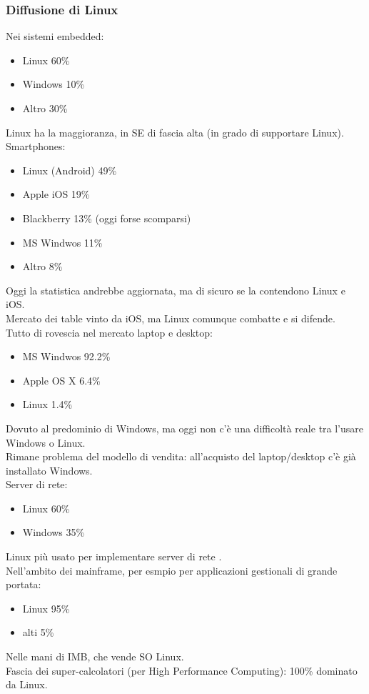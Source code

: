 \documentclass[12pt, oneside]{extbook}
\begin{document}
\subsubsection{Diffusione di Linux}
Nei sistemi embedded:
\begin{itemize}
\item Linux 60\%
\item Windows 10\%
\item Altro 30\%
\end{itemize}
Linux ha la maggioranza, in SE di fascia alta (in grado di supportare Linux).\\ Smartphones:
\begin{itemize}
\item Linux (Android) 49\%
\item Apple iOS 19\%
\item Blackberry 13\% (oggi forse scomparsi)
\item MS Windwos 11\%
\item Altro 8\%
\end{itemize}
Oggi la statistica andrebbe aggiornata, ma di sicuro se la contendono Linux e iOS.\\ Mercato dei table vinto da iOS, ma Linux comunque combatte e si difende.\\ Tutto di rovescia nel mercato laptop e desktop:
\begin{itemize}
\item MS Windwos 92.2\%
\item Apple OS X 6.4\%\\
\item Linux 1.4\%
\end{itemize}
Dovuto al predominio di Windows, ma oggi non c'è una difficoltà reale tra l'usare Windows o Linux.\\ Rimane problema del modello di vendita: all'acquisto del laptop/desktop c'è già installato Windows.\\ Server di rete:
\begin{itemize}
\item Linux 60\%
\item Windows 35\%
\end{itemize}
Linux più usato per implementare server di rete .\\ Nell'ambito dei mainframe, per esmpio per applicazioni gestionali di grande portata:
\begin{itemize}
\item Linux 95\%
\item alti 5\%
\end{itemize}
Nelle mani di IMB, che vende SO Linux.\\ Fascia dei super-calcolatori (per High Performance Computing): 100\% dominato da Linux.
\end{document}
